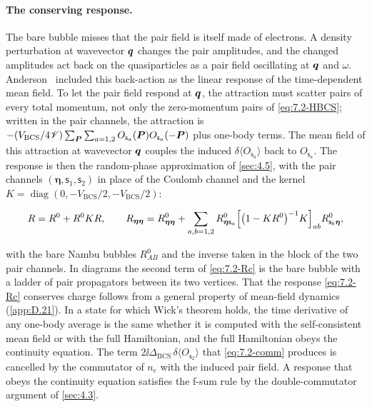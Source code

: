 \paragraph{The conserving response.} The bare bubble misses that the pair field is itself made of electrons. A density perturbation at wavevector $\bm{q}$ changes the pair amplitudes, and the changed amplitudes act back on the quasiparticles as a pair field oscillating at $\bm{q}$ and $\omega$. Anderson~\cite{anderson1958random} included this back-action as the linear response of the time-dependent mean field. To let the pair field respond at $\bm{q}$, the attraction must scatter pairs of every total momentum, not only the zero-momentum pairs of \cref{eq:7.2-HBCS}; written in the pair channels, the attraction is $-(V_{\mathrm{BCS}}/4\mathscr{V})\sum_{\bm{P}}\sum_{a=1,2}O_{\mathsf{s}_a}(\bm{P})O_{\mathsf{s}_a}(-\bm{P})$ plus one-body terms. The mean field of this attraction at wavevector $\bm{q}$ couples the induced $\delta\langle O_{\mathsf{s}_a}\rangle$ back to $O_{\mathsf{s}_a}$. The response is then the random-phase approximation of \cref{sec:4.5}, with the pair channels $(\boldsymbol{\eta}, \mathsf{s}_1, \mathsf{s}_2)$ in place of the Coulomb channel and the kernel $K = \operatorname{diag}(0, -V_{\mathrm{BCS}}/2, -V_{\mathrm{BCS}}/2)$:
\begin{keyresult}
\begin{equation}
  R = R^0 + R^0KR, \qquad
  R_{\boldsymbol{\eta}\boldsymbol{\eta}} = R^0_{\boldsymbol{\eta}\boldsymbol{\eta}} + \sum_{a,b=1,2}R^0_{\boldsymbol{\eta}\mathsf{s}_a}\Bigl[\bigl(1 - KR^0\bigr)^{-1}K\Bigr]_{ab}R^0_{\mathsf{s}_b\boldsymbol{\eta}} ,
  \label{eq:7.2-Rc}
\end{equation}
\end{keyresult}
with the bare Nambu bubbles $R^0_{AB}$ and the inverse taken in the block of the two pair channels. In diagrams the second term of \cref{eq:7.2-Rc} is the bare bubble with a ladder of pair propagators between its two vertices. That the response \cref{eq:7.2-Rc} conserves charge follows from a general property of mean-field dynamics (\cref{app:D.21}). In a state for which Wick's theorem holds, the time derivative of any one-body average is the same whether it is computed with the self-consistent mean field or with the full Hamiltonian, and the full Hamiltonian obeys the continuity equation. The term $2\ii\Delta_{\mathrm{BCS}}\,\delta\langle O_{\mathsf{s}_2}\rangle$ that \cref{eq:7.2-comm} produces is cancelled by the commutator of $n_e$ with the induced pair field. A response that obeys the continuity equation satisfies the f-sum rule by the double-commutator argument of \cref{sec:4.3}.

